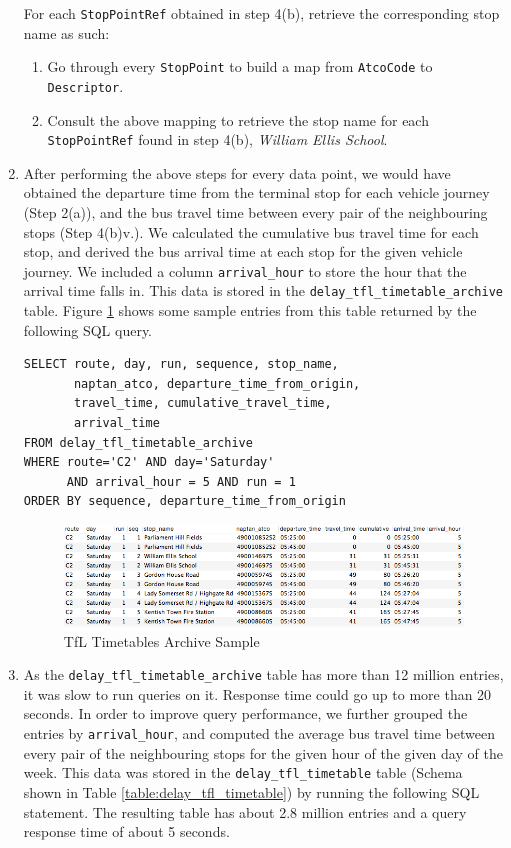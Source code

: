 \begin{enumerate}
    For each \texttt{StopPointRef} obtained in step 4(b), retrieve the corresponding stop name as such:
    \begin{enumerate}
      \item Go through every \texttt{StopPoint} to build a map from \texttt{AtcoCode} to \texttt{Descriptor}.
      \item Consult the above mapping to retrieve the stop name for each \texttt{StopPointRef} found in step 4(b), \textit{William Ellis School}.
    \end{enumerate}

    \item After performing the above steps for every data point, we would have obtained the departure time from the terminal stop for each vehicle journey (Step 2(a)), and the bus travel time between every pair of the neighbouring stops (Step 4(b)v.). We calculated the cumulative bus travel time for each stop, and derived the bus arrival time at each stop for the given vehicle journey. We included a column \texttt{arrival\_hour} to store the hour that the arrival time falls in. This data is stored in the \texttt{delay\_tfl\_timetable\_archive} table. Figure \ref{fig:tfl_timetable_archive_sample} shows some sample entries from this table returned by the following SQL query.

    \begin{verbatim}
SELECT route, day, run, sequence, stop_name,
       naptan_atco, departure_time_from_origin,
       travel_time, cumulative_travel_time,
       arrival_time
FROM delay_tfl_timetable_archive
WHERE route='C2' AND day='Saturday'
      AND arrival_hour = 5 AND run = 1
ORDER BY sequence, departure_time_from_origin
    \end{verbatim}

\begin{figure}
\centering
\includegraphics[width=\textwidth]{figures/tfl_timetable_archive_sample.png}
\caption{\label{fig:tfl_timetable_archive_sample} TfL Timetables Archive Sample}
\end{figure}

    \item As the \texttt{delay\_tfl\_timetable\_archive} table has more than 12 million entries, it was slow to run queries on it. Response time could go up to more than 20 seconds. In order to improve query performance, we further grouped the entries by \texttt{arrival\_hour}, and computed the average bus travel time between every pair of the neighbouring stops for the given hour of the given day of the week. This data was stored in the \texttt{delay\_tfl\_timetable} table (Schema shown in Table \ref{table:delay_tfl_timetable}) by running the following SQL statement. The resulting table has about 2.8 million entries and a query response time of about 5 seconds.


\end{enumerate}
